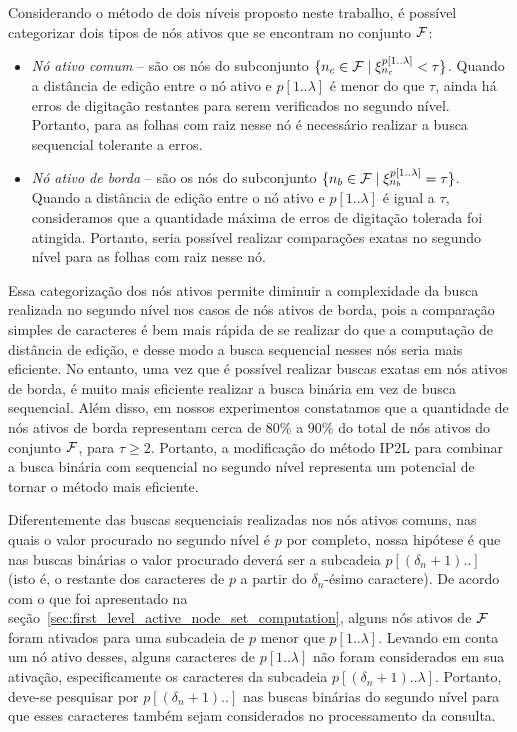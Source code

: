 Considerando o método de dois níveis proposto neste trabalho, é possível categorizar dois tipos de nós ativos que se encontram no conjunto $\mathcal{F}$:

\begin{itemize}
    \item \textit{Nó ativo comum} -- são os nós do subconjunto $\{n_{c} \in \mathcal{F} \mid \xi_{n_{c}}^{p[1..\lambda]} < \tau \}$. Quando a distância de edição entre o nó ativo e $p[1..\lambda]$ é menor do que $\tau$, ainda há erros de digitação restantes para serem verificados no segundo nível. Portanto, para as folhas com raiz nesse nó é necessário realizar a busca sequencial tolerante a erros.
    \item \textit{Nó ativo de borda} -- são os nós do subconjunto $\{n_{b} \in \mathcal{F} \mid \xi_{n_{b}}^{p[1..\lambda]} = \tau \}$. Quando a distância de edição entre o nó ativo e $p[1..\lambda]$ é igual a $\tau$, consideramos que a quantidade máxima de erros de digitação tolerada foi atingida. Portanto, seria possível realizar comparações exatas no segundo nível para as folhas com raiz nesse nó.
\end{itemize}

Essa categorização dos nós ativos permite diminuir a complexidade da busca realizada no segundo nível nos casos de nós ativos de borda, pois a comparação simples de caracteres é bem mais rápida de se realizar do que a computação de distância de edição, e desse modo a busca sequencial nesses nós seria mais eficiente. No entanto, uma vez que é possível realizar buscas exatas em nós ativos de borda, é muito mais eficiente realizar a busca binária em vez de busca sequencial. Além disso, em nossos experimentos constatamos que a quantidade de nós ativos de borda representam cerca de $80\%$ a $90\%$ do total de nós ativos do conjunto $\mathcal{F}$, para $\tau \geq 2$. Portanto, a modificação do método IP2L para combinar a busca binária com sequencial no segundo nível representa um potencial de tornar o método mais eficiente.

Diferentemente das buscas sequenciais realizadas nos nós ativos comuns, nas quais o valor procurado no segundo nível é $p$ por completo, nossa hipótese é que nas buscas binárias o valor procurado deverá ser a subcadeia $p[(\delta_{n} + 1)..]$ (isto é, o restante dos caracteres de $p$ a partir do $\delta_{n}$-ésimo caractere). De acordo com o que foi apresentado na seção~\ref{sec:first_level_active_node_set_computation}, alguns nós ativos de $\mathcal{F}$ foram ativados para uma subcadeia de $p$ menor que $p[1..\lambda]$. Levando em conta um nó ativo desses, alguns caracteres de $p[1..\lambda]$ não foram considerados em sua ativação, especificamente os caracteres da subcadeia $p[(\delta_{n}+1)..\lambda]$. Portanto, deve-se pesquisar por $p[(\delta_{n} + 1)..]$ nas buscas binárias do segundo nível para que esses caracteres também sejam considerados no processamento da consulta.

